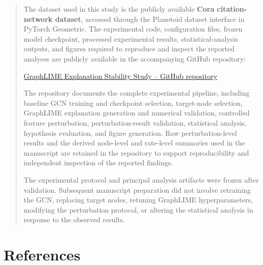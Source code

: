 \documentclass[a4paper]{article}
\begin{document}
\begin{quote}
The dataset used in this study is the publicly available \textbf{Cora
citation-network dataset}, accessed through the Planetoid dataset
interface in PyTorch Geometric. The experimental code, configuration
files, frozen model checkpoint, processed experimental results,
statistical-analysis outputs, and figures required to reproduce and
inspect the reported analyses are publicly available in the accompanying
GitHub repository:

\href{https://github.com/ngclara07/graphlime-stability}{GraphLIME
Explanation Stability Study -- GitHub repository}

The repository documents the complete experimental pipeline, including
baseline GCN training and checkpoint selection, target-node selection,
GraphLIME explanation generation and numerical validation, controlled
feature perturbation, perturbation-result validation, statistical
analysis, hypothesis evaluation, and figure generation. Raw
perturbation-level results and the derived node-level and rate-level
summaries used in the manuscript are retained in the repository to
support reproducibility and independent inspection of the reported
findings.

The experimental protocol and principal analysis artifacts were frozen
after validation. Subsequent manuscript preparation did not involve
retraining the GCN, replacing target nodes, retuning GraphLIME
hyperparameters, modifying the perturbation protocol, or altering the
statistical analysis in response to the observed results.
\end{quote}

\section{References}\label{references}
\end{document}
